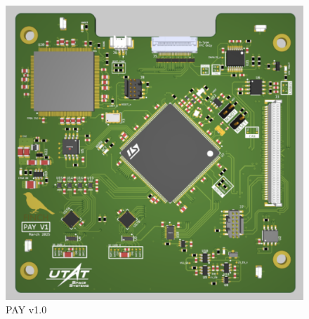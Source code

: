\documentclass[10pt]{../datasheet}
\begin{document}

\begin{figure}[H]
  \centering
  \includegraphics[width=0.95\linewidth]{../figures/PAY_SS.png}
  \caption{\centering PAY v1.0}
  \label{fig:enter-label}
\end{figure}

\onecolumn
\end{document}

